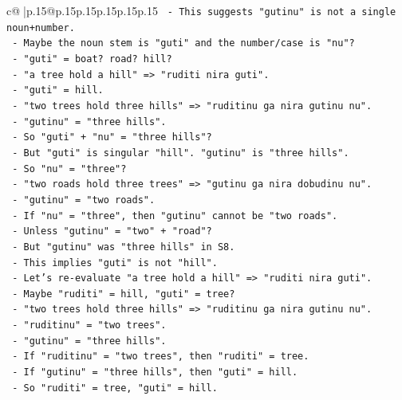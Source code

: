 \documentclass{article}
\begin{document}
{\begin{supertabular}{c@{$\;$}|p{.15\linewidth}@{}p{.15\linewidth}p{.15\linewidth}p{.15\linewidth}p{.15\linewidth}p{.15\linewidth}}
{{{\texttt{            {-} This suggests "gutinu" is not a single noun+number.} \\
\texttt{            {-} Maybe the noun stem is "guti" and the number/case is "nu"?} \\
\texttt{            {-} "guti" = boat? road? hill?} \\
\texttt{            {-} "a tree hold a hill" => "ruditi nira guti".} \\
\texttt{              {-} "guti" = hill.} \\
\texttt{            {-} "two trees hold three hills" => "ruditinu ga nira gutinu nu".} \\
\texttt{              {-} "gutinu" = "three hills".} \\
\texttt{              {-} So "guti" + "nu" = "three hills"?} \\
\texttt{              {-} But "guti" is singular "hill". "gutinu" is "three hills".} \\
\texttt{              {-} So "nu" = "three"?} \\
\texttt{            {-} "two roads hold three trees" => "gutinu ga nira dobudinu nu".} \\
\texttt{              {-} "gutinu" = "two roads".} \\
\texttt{              {-} If "nu" = "three", then "gutinu" cannot be "two roads".} \\
\texttt{              {-} Unless "gutinu" = "two" + "road"?} \\
\texttt{              {-} But "gutinu" was "three hills" in S8.} \\
\texttt{              {-} This implies "guti" is not "hill".} \\
\texttt{              {-} Let's re{-}evaluate "a tree hold a hill" => "ruditi nira guti".} \\
\texttt{                {-} Maybe "ruditi" = hill, "guti" = tree?} \\
\texttt{                {-} "two trees hold three hills" => "ruditinu ga nira gutinu nu".} \\
\texttt{                  {-} "ruditinu" = "two trees".} \\
\texttt{                  {-} "gutinu" = "three hills".} \\
\texttt{                  {-} If "ruditinu" = "two trees", then "ruditi" = tree.} \\
\texttt{                  {-} If "gutinu" = "three hills", then "guti" = hill.} \\
\texttt{                {-} So "ruditi" = tree, "guti" = hill.} \\
}}}
\end{supertabular}}
\end{document}
